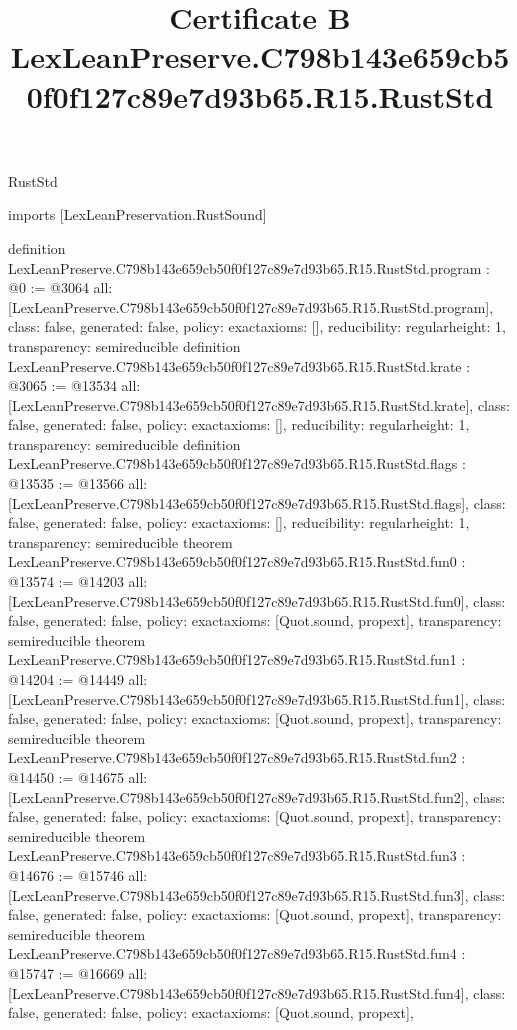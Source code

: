 \begin{lexlean}{RustStd}
\title{Certificate B LexLeanPreserve.C798b143e659cb50f0f127c89e7d93b65.R15.RustStd}
\begin{coremodule}
imports [LexLeanPreservation.RustSound]

definition LexLeanPreserve.C798b143e659cb50f0f127c89e7d93b65.R15.RustStd.program : @0 := @3064 {
  all: [LexLeanPreserve.C798b143e659cb50f0f127c89e7d93b65.R15.RustStd.program],
  class: false,
  generated: false,
  policy: exact{axioms: []},
  reducibility: regular{height: 1},
  transparency: semireducible
}
definition LexLeanPreserve.C798b143e659cb50f0f127c89e7d93b65.R15.RustStd.krate : @3065 := @13534 {
  all: [LexLeanPreserve.C798b143e659cb50f0f127c89e7d93b65.R15.RustStd.krate],
  class: false,
  generated: false,
  policy: exact{axioms: []},
  reducibility: regular{height: 1},
  transparency: semireducible
}
definition LexLeanPreserve.C798b143e659cb50f0f127c89e7d93b65.R15.RustStd.flags : @13535 := @13566 {
  all: [LexLeanPreserve.C798b143e659cb50f0f127c89e7d93b65.R15.RustStd.flags],
  class: false,
  generated: false,
  policy: exact{axioms: []},
  reducibility: regular{height: 1},
  transparency: semireducible
}
theorem LexLeanPreserve.C798b143e659cb50f0f127c89e7d93b65.R15.RustStd.fun0 : @13574 := @14203 {
  all: [LexLeanPreserve.C798b143e659cb50f0f127c89e7d93b65.R15.RustStd.fun0],
  class: false,
  generated: false,
  policy: exact{axioms: [Quot.sound, propext]},
  transparency: semireducible
}
theorem LexLeanPreserve.C798b143e659cb50f0f127c89e7d93b65.R15.RustStd.fun1 : @14204 := @14449 {
  all: [LexLeanPreserve.C798b143e659cb50f0f127c89e7d93b65.R15.RustStd.fun1],
  class: false,
  generated: false,
  policy: exact{axioms: [Quot.sound, propext]},
  transparency: semireducible
}
theorem LexLeanPreserve.C798b143e659cb50f0f127c89e7d93b65.R15.RustStd.fun2 : @14450 := @14675 {
  all: [LexLeanPreserve.C798b143e659cb50f0f127c89e7d93b65.R15.RustStd.fun2],
  class: false,
  generated: false,
  policy: exact{axioms: [Quot.sound, propext]},
  transparency: semireducible
}
theorem LexLeanPreserve.C798b143e659cb50f0f127c89e7d93b65.R15.RustStd.fun3 : @14676 := @15746 {
  all: [LexLeanPreserve.C798b143e659cb50f0f127c89e7d93b65.R15.RustStd.fun3],
  class: false,
  generated: false,
  policy: exact{axioms: [Quot.sound, propext]},
  transparency: semireducible
}
theorem LexLeanPreserve.C798b143e659cb50f0f127c89e7d93b65.R15.RustStd.fun4 : @15747 := @16669 {
  all: [LexLeanPreserve.C798b143e659cb50f0f127c89e7d93b65.R15.RustStd.fun4],
  class: false,
  generated: false,
  policy: exact{axioms: [Quot.sound, propext]},
}
\end{coremodule}
\end{lexlean}
